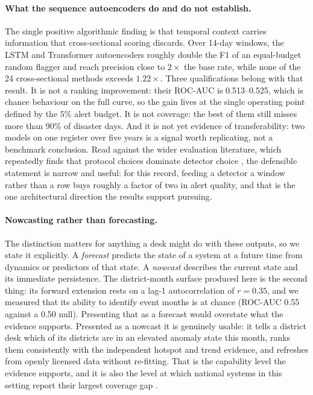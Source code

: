 \documentclass[preprint,12pt]{elsarticle}
\begin{document}
\paragraph{What the sequence autoencoders do and do not establish.} The single
positive algorithmic finding is that temporal context carries information that
cross-sectional scoring discards. Over 14-day windows, the LSTM and Transformer
autoencoders roughly double the F1 of an equal-budget random flagger and reach
precision close to $2\times$ the base rate, while none of the 24 cross-sectional
methods exceeds $1.22\times$. Three qualifications belong with that result. It is
not a ranking improvement: their ROC-AUC is 0.513--0.525, which is chance
behaviour on the full curve, so the gain lives at the single operating point
defined by the $5\%$ alert budget. It is not coverage: the best of them still
misses more than 90\% of disaster days. And it is not yet evidence of
transferability: two models on one register over five years is a signal worth
replicating, not a benchmark conclusion. Read against the wider evaluation
literature, which repeatedly finds that protocol choices dominate detector choice
\cite{schmidl2022,blazquez2021}, the defensible statement is narrow and useful:
for this record, feeding a detector a window rather than a row buys roughly a
factor of two in alert quality, and that is the one architectural direction the
results support pursuing.

\paragraph{Nowcasting rather than forecasting.} The distinction matters for
anything a desk might do with these outputs, so we state it explicitly. A
\emph{forecast} predicts the state of a system at a future time from dynamics or
predictors of that state. A \emph{nowcast} describes the current state and its
immediate persistence. The district-month surface produced here is the second
thing: its forward extension rests on a lag-1 autocorrelation of $r=0.35$, and we
measured that its ability to identify event months is at chance (ROC-AUC 0.55
against a 0.50 null). Presenting that as a forecast would overstate what the
evidence supports. Presented as a
nowcast it is genuinely usable: it tells a district desk which of its districts are
in an elevated anomaly state this month, ranks them consistently with the
independent hotspot and trend evidence, and refreshes from openly licensed data
without re-fitting. That is the capability level the evidence supports, and it is
also the level at which national systems in this setting report their largest
coverage gap \cite{namwano2024,wmo2023,venning2025}.
\end{document}
